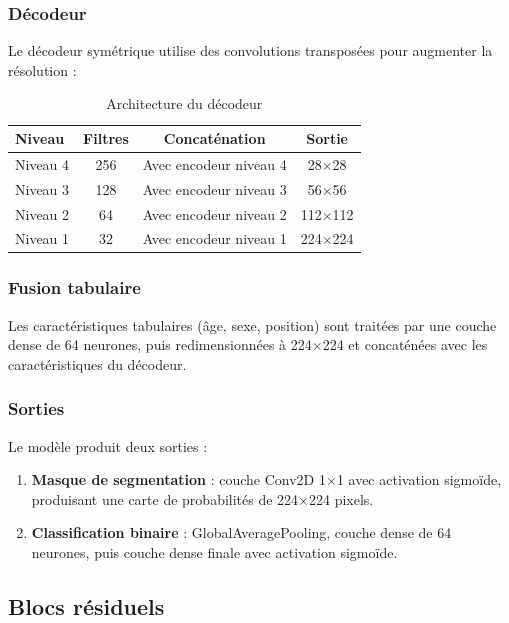 \documentclass[12pt,a4paper,twoside]{report}
\begin{document}
\subsubsection{Décodeur}

Le décodeur symétrique utilise des convolutions transposées pour augmenter la résolution :

\begin{table}[H]
\centering
\begin{tabular}{lccc}
\toprule
\textbf{Niveau} & \textbf{Filtres} & \textbf{Concaténation} & \textbf{Sortie} \\
\midrule
Niveau 4 & 256 & Avec encodeur niveau 4 & 28$\times$28 \\
Niveau 3 & 128 & Avec encodeur niveau 3 & 56$\times$56 \\
Niveau 2 & 64 & Avec encodeur niveau 2 & 112$\times$112 \\
Niveau 1 & 32 & Avec encodeur niveau 1 & 224$\times$224 \\
\bottomrule
\end{tabular}
\caption{Architecture du décodeur}
\end{table}

\subsubsection{Fusion tabulaire}

Les caractéristiques tabulaires (âge, sexe, position) sont traitées par une couche dense de 64 neurones, puis redimensionnées à 224$\times$224 et concaténées avec les caractéristiques du décodeur.

\subsubsection{Sorties}

Le modèle produit deux sorties :
\begin{enumerate}
  \item \textbf{Masque de segmentation} : couche Conv2D 1$\times$1 avec activation sigmoïde, produisant une carte de probabilités de 224$\times$224 pixels.
  \item \textbf{Classification binaire} : GlobalAveragePooling, couche dense de 64 neurones, puis couche dense finale avec activation sigmoïde.
\end{enumerate}

\subsection{Blocs résiduels}
\end{document}
